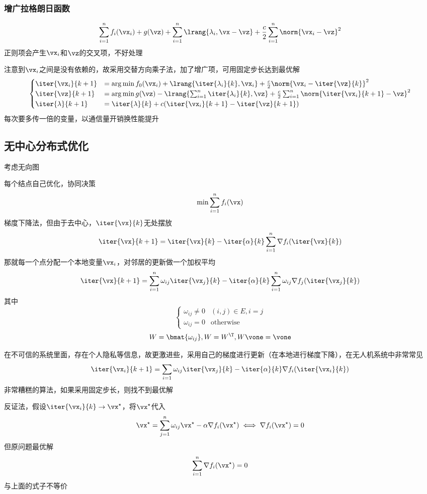 \subsubsection{增广拉格朗日函数}
\[\sum_{i=1}^nf_i(\vx_i)+g(\vz)+\sum_{i=1}^n\lrang{\lambda_i,\vx-\vz}+\frac{c}{2}\sum_{i=1}^n\norm{\vx_i-\vz}^2\]
正则项会产生$\vx_i$和$\vz$的交叉项，不好处理

注意到$\vx_i$之间是没有依赖的，故采用交替方向乘子法，加了增广项，可用固定步长达到最优解
\[\begin{cases}
    \iter{\vx_i}{k+1}&=\arg\min f_0(\vx_i)+\lrang{\iter{\lambda_i}{k},\vx_i}+\frac{c}{2}\norm{\vx_i-\iter{\vz}{k}}^2\\
    \iter{\vz}{k+1}&=\arg\min g(\vz)-\lrang{\sum_{i=1}^n\iter{\lambda_i}{k},\vz}+\frac{c}{2}\sum_{i=1}^n\norm{\iter{\vx_i}{k+1}-\vz}^2\\
    \iter{\lambda}{k+1}&=\iter{\lambda}{k}+c(\iter{\vx_i}{k+1}-\iter{\vz}{k+1})
\end{cases}\]
每次要多传一倍的变量，以通信量开销换性能提升

\subsection{无中心分布式优化}
\par 考虑无向图
\begin{center}
\end{center}
每个结点自己优化，协同决策
\[\min\sum_{i=1}^n f_i(\vx)\]
梯度下降法，但由于去中心，$\iter{\vx}{k}$无处摆放
\[\iter{\vx}{k+1}=\iter{\vx}{k}-\iter{\alpha}{k}\sum_{i=1}^n\nabla f_i(\iter{\vx}{k})\]
那就每一个点分配一个本地变量$\vx_i$，对邻居的更新做一个加权平均
\[\iter{\vx}{k+1}=\sum_{i=1}^n\omega_{ij}\iter{\vx_j}{k}-\iter{\alpha}{k}\sum_{i=1}^n\omega_{ij}\nabla f_j(\iter{\vx_j}{k})\]
其中
\[\begin{cases}
    \omega_{ij}\ne 0 & (i,j)\in E, i=j\\
    \omega_{ij}=0 & \text{otherwise}
\end{cases}\]
\[W=\bmat{\omega_{ij}},W=W^\T,W\vone=\vone\]

在不可信的系统里面，存在个人隐私等信息，故更激进些，采用自己的梯度进行更新（在本地进行梯度下降），在无人机系统中非常常见
\[\iter{\vx_i}{k+1}=\sum_{i=1}\omega_{ij}\iter{\vx_j}{k}-\iter{\alpha}{k}\nabla f_i(\iter{\vx_i}{k})\]
非常糟糕的算法，如果采用固定步长，则找不到最优解
\begin{analysis}
反证法，假设$\iter{\vx_i}{k}\to \vx^\star$，将$\vx^\star$代入
\[\vx^\star=\sum_{j=1}^n\omega_{ij}\vx^\star-\alpha\nabla f_i(\vx^\star)\iff \nabla f_i(\vx^\star)=0\]
但原问题最优解
\[\sum_{i=1}^n\nabla f_i(\vx^\star)=0\]
与上面的式子不等价
\end{analysis}

